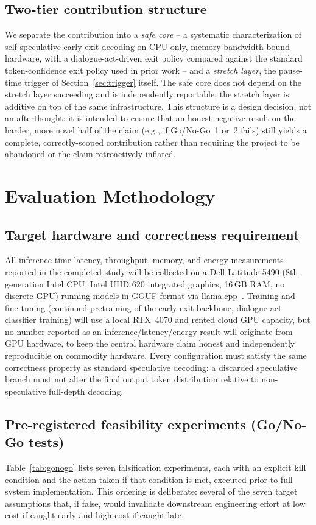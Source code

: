 \documentclass[journal]{IEEEtran}
\begin{document}
\subsection{Two-tier contribution structure}
We separate the contribution into a \emph{safe core} -- a systematic characterization of self-speculative early-exit decoding on CPU-only, memory-bandwidth-bound hardware, with a dialogue-act-driven exit policy compared against the standard token-confidence exit policy used in prior work -- and a \emph{stretch layer}, the pause-time trigger of Section~\ref{sec:trigger} itself. The safe core does not depend on the stretch layer succeeding and is independently reportable; the stretch layer is additive on top of the same infrastructure. This structure is a design decision, not an afterthought: it is intended to ensure that an honest negative result on the harder, more novel half of the claim (e.g., if Go/No-Go~1 or~2 fails) still yields a complete, correctly-scoped contribution rather than requiring the project to be abandoned or the claim retroactively inflated.

\section{Evaluation Methodology}
\label{sec:evaluation}

\subsection{Target hardware and correctness requirement}
All inference-time latency, throughput, memory, and energy measurements reported in the completed study will be collected on a Dell Latitude 5490 (8th-generation Intel CPU, Intel UHD 620 integrated graphics, 16\,GB RAM, no discrete GPU) running models in GGUF format via llama.cpp~\cite{llamacpp}. Training and fine-tuning (continued pretraining of the early-exit backbone, dialogue-act classifier training) will use a local RTX~4070 and rented cloud GPU capacity, but no number reported as an inference/latency/energy result will originate from GPU hardware, to keep the central hardware claim honest and independently reproducible on commodity hardware. Every configuration must satisfy the same correctness property as standard speculative decoding: a discarded speculative branch must not alter the final output token distribution relative to non-speculative full-depth decoding.

\subsection{Pre-registered feasibility experiments (Go/No-Go tests)}
Table~\ref{tab:gonogo} lists seven falsification experiments, each with an explicit kill condition and the action taken if that condition is met, executed prior to full system implementation. This ordering is deliberate: several of the seven target assumptions that, if false, would invalidate downstream engineering effort at low cost if caught early and high cost if caught late.
\end{document}
